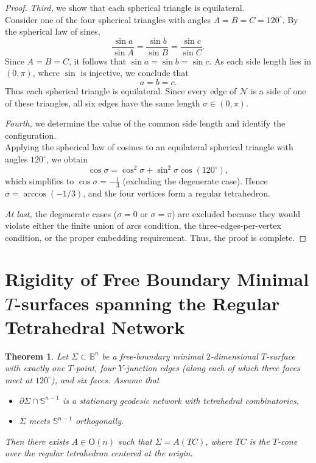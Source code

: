 \documentclass[11pt]{amsart}
\numberwithin{equation}{section}
\theoremstyle{theorem}
\newtheorem{theorem}{Theorem}[section]
\theoremstyle{definition}
\numberwithin{equation}{section}
\begin{document}
\begin{proof}
\textit{Third,} we show that each spherical triangle is equilateral. \\ 
Consider one of the four spherical triangles with angles $A = B = C = 120^\circ$. By the spherical law of sines,
\[
\frac{\sin a}{\sin A} = \frac{\sin b}{\sin B} = \frac{\sin c}{\sin C}.
\]
Since $A = B = C$, it follows that $\sin a = \sin b = \sin c$. As each side length lies in $(0,\pi)$, where $\sin$ is injective, we conclude that
\[
a = b = c.
\]
Thus each spherical triangle is equilateral. Since every edge of $\mathcal{N}$ is a side of one of these triangles, all six edges have the same length $\sigma \in (0,\pi)$.
\medskip


\textit{Fourth,} we determine the value of the common side length and identify the configuration. \\ 
Applying the spherical law of cosines to an equilateral spherical triangle with angles $120^\circ$, we obtain
\[
\cos \sigma = \cos^2 \sigma + \sin^2 \sigma \cos(120^\circ),
\]
which simplifies to $\cos \sigma = -\tfrac{1}{3}$ (excluding the degenerate case). Hence $\sigma = \arccos(-1/3)$, and the four vertices form a regular tetrahedron.
\medskip


\textit{At last,} the degenerate cases ($\sigma = 0$ or $\sigma = \pi$) are excluded because they would violate either the finite union of arcs condition, the three-edges-per-vertex condition, or the proper embedding requirement. Thus, the proof is complete.
\end{proof}



\section{Rigidity of Free Boundary Minimal $T$-surfaces spanning  the Regular Tetrahedral  Network}\label{sec:uniq. FBM TS with NT}

\begin{theorem}\label{Thm:uniq. FBMT with NT}
Let \(\Sigma \subset \mathbb{B}^n\) be a free-boundary minimal $2$-dimensional $T$-surface with exactly one $T$-point, four $Y$-junction edges (along each of which three faces meet at $120^\circ$), and six faces. Assume that
\begin{itemize}
\item \(\partial \Sigma \cap \mathbb{S}^{n-1}\) is a stationary geodesic network with tetrahedral combinatorics,
\item \(\Sigma\) meets \(\mathbb{S}^{n-1}\) orthogonally.
\end{itemize}
Then there exists \(A \in \mathrm{O}(n)\) such that \(\Sigma = A(TC)\), where \(TC\) is the $T$-cone over the regular tetrahedron centered at the origin.
\end{theorem}
\end{document}
